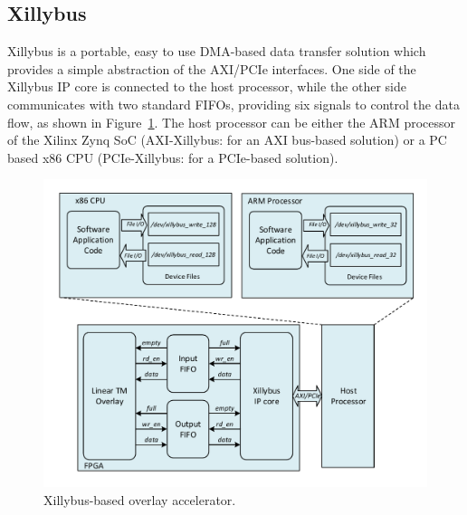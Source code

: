 

\subsection{Xillybus}
Xillybus is a portable, easy to use DMA-based data transfer solution which provides a simple abstraction of the AXI/PCIe interfaces. 
One side of the Xillybus IP core is connected to the host processor, while the other side communicates with two standard FIFOs, providing six signals to control the data flow, as shown in Figure~\ref{xillybus}. 
The host processor can be either the ARM processor of the Xilinx Zynq SoC (AXI-Xillybus: for an AXI bus-based solution) or a PC based x86 CPU (PCIe-Xillybus: for a PCIe-based solution). 

\begin{figure}[tb]
	\centering
	\includegraphics[width=0.9\columnwidth]{Figures/xillybus.pdf}
	\caption{Xillybus-based overlay accelerator.}
	\label{xillybus} 
\end{figure}

